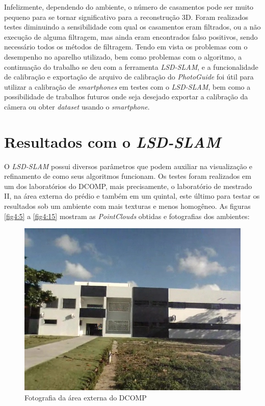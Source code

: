 Infelizmente, dependendo do ambiente, o número de casamentos pode ser muito pequeno para se tornar significativo para a reconstrução 3D. Foram realizados testes diminuindo a sensibilidade com qual os casamentos eram filtrados, ou a não execução de alguma filtragem, mas ainda eram encontrados falso positivos, sendo necessário todos os métodos de filtragem. 
	Tendo em vista os problemas com o desempenho no aparelho utilizado, bem como problemas com o algoritmo, a continuação do trabalho se deu com a ferramenta \textit{LSD-SLAM}, e a funcionalidade de calibração e exportação de arquivo de calibração do \textit{PhotoGuide} foi útil para utilizar a calibração de \textit{smartphones} em testes com o \textit{LSD-SLAM}, bem como a possibilidade de trabalhos futuros onde seja desejado exportar a calibração da câmera ou obter \textit{dataset} usando o \textit{smartphone}.
	
\section{Resultados com o \textit{LSD-SLAM}}

O \textit{LSD-SLAM} possui diversos parâmetros que podem auxiliar na visualização e refinamento de como seus algoritmos funcionam. Os testes foram realizados em um dos laboratórios do DCOMP, mais precisamente, o laboratório de mestrado II, na área externa do prédio e também em um quintal, este último para testar os resultados sob um ambiente com mais texturas e menos homogêneo. As figuras \ref{fig4:5} a \ref{fig4:15} mostram as \textit{PointClouds} obtidas e fotografias dos ambientes:

\begin{figure}[H]
	\centering
		\includegraphics[width= \textwidth]{Imagens/figura4-7.jpg}
	\caption{Fotografia da área externa do DCOMP}
	\label{fig4:7}
\end{figure}

